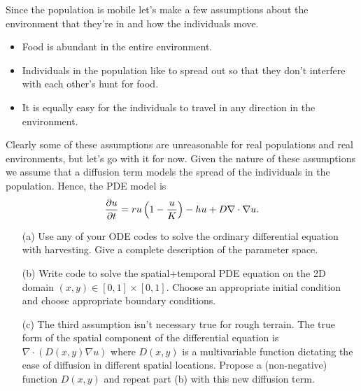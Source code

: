 Since the population is mobile let's make a few assumptions about the environment that
they're in and how the individuals move.
\begin{itemize}
    \item Food is abundant in the entire environment.
    \item Individuals in the population like to spread out so that they don't
        interfere with each other's hunt for food.
    \item It is equally easy for the individuals to travel in any direction in the
        environment.
\end{itemize}
Clearly some of these assumptions are unreasonable for real populations and real
environments, but let's go with it for now.  Given the nature of these assumptions we
assume that a diffusion term models the spread of the individuals in the population.
Hence, the PDE model is
\[ \frac{\partial{u}}{\partial{t}} = ru\left( 1-\frac{u}{K} \right) - hu + D \nabla \cdot \nabla u. \]
\begin{enumerate}
    \item[(a)] Use any of your ODE codes to solve the ordinary differential equation
        with harvesting.  Give a complete description of the parameter space.
    \item[(b)] Write code to solve the spatial+temporal PDE equation on the 2D domain
        $(x,y) \in [0,1] \times [0,1]$.  Choose an appropriate initial condition and
        choose appropriate boundary conditions.
    \item[(c)] The third assumption isn't necessary true for rough terrain. The true
        form of the spatial component of the differential equation is $\nabla \cdot
        \left( D(x,y) \nabla u \right)$ where $D(x,y)$ is a multivariable function
        dictating the ease of diffusion in different spatial locations.  Propose a
        (non-negative) function $D(x,y)$ and repeat part (b) with this new diffusion
        term.
\end{enumerate}

